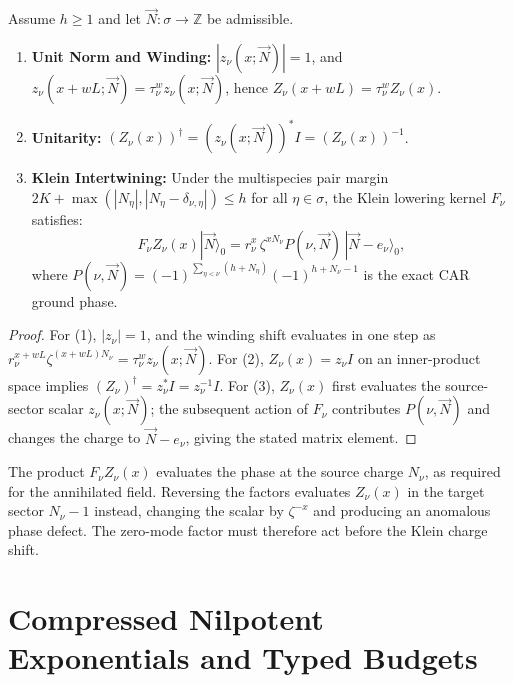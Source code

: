 \begin{lemma}
\label{lem:zero_mode_properties}
Assume $h \ge 1$ and let $\vec{N} : \sigma \to \mathbb{Z}$ be admissible.
\begin{enumerate}
    \item \textbf{Unit Norm and Winding:} $|z_\nu(x; \vec{N})| = 1$, and $z_\nu(x + w L; \vec{N}) = \tau_\nu^w z_\nu(x; \vec{N})$, hence $Z_\nu(x + w L) = \tau_\nu^w Z_\nu(x)$.
    \item \textbf{Unitarity:} $(Z_\nu(x))^\dagger = (z_\nu(x; \vec{N}))^* I = (Z_\nu(x))^{-1}$.
    \item \textbf{Klein Intertwining:} Under the multispecies pair margin $2K + \max(|N_\eta|, |N_\eta - \delta_{\nu, \eta}|) \le h$ for all $\eta \in \sigma$, the Klein lowering kernel $F_\nu$ satisfies:
    \begin{equation}
    F_\nu Z_\nu(x) |\vec{N}\rangle_0 = r_\nu^x\, \zeta^{x N_\nu} P(\nu, \vec{N})\, |\vec{N} - e_\nu\rangle_0,
    \end{equation}
    where $P(\nu, \vec{N}) = (-1)^{\sum_{\eta < \nu} (h + N_\eta)} (-1)^{h + N_\nu - 1}$ is the exact CAR ground phase.
\end{enumerate}
\end{lemma}

\begin{proof}
For (1), $|z_\nu|=1$, and the winding shift evaluates in one step as $r_\nu^{x+wL}\zeta^{(x+wL)N_\nu}=\tau_\nu^w z_\nu(x;\vec{N})$.
For (2), $Z_\nu(x) = z_\nu I$ on an inner-product space implies $(Z_\nu)^\dagger = z_\nu^* I = z_\nu^{-1} I$.
For (3), $Z_\nu(x)$ first evaluates the source-sector scalar $z_\nu(x;\vec{N})$; the subsequent action of $F_\nu$ contributes $P(\nu,\vec{N})$ and changes the charge to $\vec{N}-e_\nu$, giving the stated matrix element.
\end{proof}

\begin{remark}
The product $F_\nu Z_\nu(x)$ evaluates the phase at the source charge $N_\nu$, as required for the annihilated field. Reversing the factors evaluates $Z_\nu(x)$ in the target sector $N_\nu-1$ instead, changing the scalar by $\zeta^{-x}$ and producing an anomalous phase defect. The zero-mode factor must therefore act before the Klein charge shift.
\end{remark}

\section{Compressed Nilpotent Exponentials and Typed Budgets}

